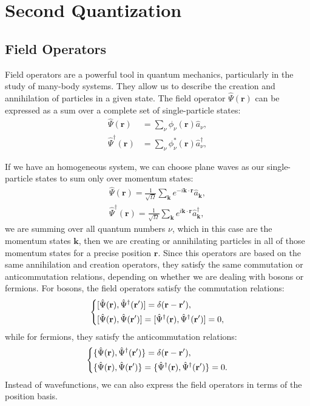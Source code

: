 \chapter{Second Quantization}

\section{Field Operators}

Field operators are a powerful tool in quantum mechanics, particularly in the study of many-body systems. They allow us to describe the creation and annihilation of particles in a given state. The field operator $\hat{\Psi}(\mathbf{r})$ can be expressed as a sum over a complete set of single-particle states:
\[
    \begin{aligned}
        \hat{\Psi}(\mathbf{r})         & = \sum_{\nu} \phi_\nu(\mathbf{r}) \hat{a}_\nu,           \\
        \hat{\Psi}^\dagger(\mathbf{r}) & = \sum_{\nu} \phi_\nu^*(\mathbf{r}) \hat{a}_\nu^\dagger,
    \end{aligned}
\]

If we have an homogeneous system, we can choose plane waves as our single-particle states to sum only over momentum states:
\[
    \begin{aligned}
        \hat{\Psi}(\mathbf{r}) = \frac{1}{\sqrt{\Omega}} \sum_{\mathbf{k}} e^{-i \mathbf{k} \cdot \mathbf{r}} \hat{a}_{\mathbf{k}}, \\
        \hat{\Psi}^\dagger(\mathbf{r}) = \frac{1}{\sqrt{\Omega}} \sum_{\mathbf{k}} e^{i \mathbf{k} \cdot \mathbf{r}} \hat{a}_{\mathbf{k}}^\dagger,
    \end{aligned}
\]
we are summing over all quantum numbers $\nu$, which in this case are the momentum states $\mathbf{k}$, then we are creating or annihilating particles in all of those momentum states for a precise position $\mathbf{r}$. Since this operators are based on the same annihilation and creation operators, they satisfy the same commutation or anticommutation relations, depending on whether we are dealing with bosons or fermions. For bosons, the field operators satisfy the commutation relations:
\[
    \begin{dcases}
        [\hat{\Psi}(\mathbf{r}), \hat{\Psi}^\dagger(\mathbf{r}')]  = \delta(\mathbf{r} - \mathbf{r}'), \\
        [\hat{\Psi}(\mathbf{r}), \hat{\Psi}(\mathbf{r}')] = [\hat{\Psi}^\dagger(\mathbf{r}), \hat{\Psi}^\dagger(\mathbf{r}')] = 0,
    \end{dcases}
\]
while for fermions, they satisfy the anticommutation relations:
\[
    \begin{dcases}
        \{\hat{\Psi}(\mathbf{r}), \hat{\Psi}^\dagger(\mathbf{r}')\} = \delta(\mathbf{r} - \mathbf{r}'), \\
        \{\hat{\Psi}(\mathbf{r}), \hat{\Psi}(\mathbf{r}')\} = \{\hat{\Psi}^\dagger(\mathbf{r}), \hat{\Psi}^\dagger(\mathbf{r}')\} = 0.
    \end{dcases}
\]
Instead of wavefunctions, we can also express the field operators in terms of the position basis.

